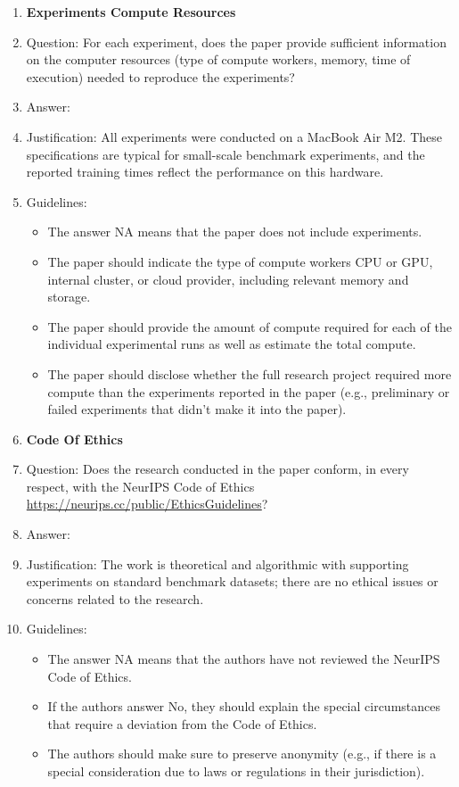 \documentclass{article}
\begin{document}
\begin{enumerate}
\item {\bf Experiments Compute Resources}
    \item[] Question: For each experiment, does the paper provide sufficient information on the computer resources (type of compute workers, memory, time of execution) needed to reproduce the experiments?
    \item[] Answer: \answerYes{}
    \item[] Justification: All experiments were conducted on a MacBook Air M2. These specifications are typical for small-scale benchmark experiments, and the reported training times reflect the performance on this hardware.
    \item[] Guidelines:
    \begin{itemize}
        \item The answer NA means that the paper does not include experiments.
        \item The paper should indicate the type of compute workers CPU or GPU, internal cluster, or cloud provider, including relevant memory and storage.
        \item The paper should provide the amount of compute required for each of the individual experimental runs as well as estimate the total compute. 
        \item The paper should disclose whether the full research project required more compute than the experiments reported in the paper (e.g., preliminary or failed experiments that didn't make it into the paper). 
    \end{itemize}
    
\item {\bf Code Of Ethics}
    \item[] Question: Does the research conducted in the paper conform, in every respect, with the NeurIPS Code of Ethics \url{https://neurips.cc/public/EthicsGuidelines}?
    \item[] Answer: \answerYes{}
    \item[] Justification: The work is theoretical and algorithmic with supporting experiments on standard benchmark datasets; there are no ethical issues or concerns related to the research.
    \item[] Guidelines:
    \begin{itemize}
        \item The answer NA means that the authors have not reviewed the NeurIPS Code of Ethics.
        \item If the authors answer No, they should explain the special circumstances that require a deviation from the Code of Ethics.
        \item The authors should make sure to preserve anonymity (e.g., if there is a special consideration due to laws or regulations in their jurisdiction).
    \end{itemize}



\end{enumerate}
\end{document}
